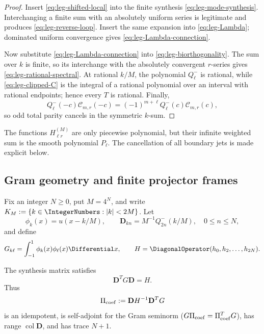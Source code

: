{\begin{proof}
Insert \eqref{eq:leg-shifted-local} into the finite synthesis
\eqref{eq:leg-mode-synthesis}.  Interchanging a finite sum with an absolutely
uniform series is legitimate and produces \eqref{eq:leg-reverse-loop}.
Insert the same expansion into \eqref{eq:leg-Lambda}; dominated uniform
convergence gives \eqref{eq:leg-Lambda-connection}.

Now substitute \eqref{eq:leg-Lambda-connection} into
\eqref{eq:leg-biorthogonality}.  The sum over $k$ is finite, so its
interchange with the absolutely convergent $r$-series gives
\eqref{eq:leg-rational-spectral}.  At rational $k/M$, the polynomial
$Q_\ell^-$ is rational, while \eqref{eq:leg-clipped-C} is the integral of a
rational polynomial over an interval with rational endpoints; hence every
$T$ is rational.  Finally,
\[
 Q_\ell^-(-c)\mathscr C_{m,r}(-c)
 =(-1)^{m+\ell}Q_\ell^-(c)\mathscr C_{m,r}(c),
\]
so odd total parity cancels in the symmetric $k$-sum.
\end{proof}

The functions $H_{\ell r}^{(M)}$ are only piecewise polynomial, but their
infinite weighted sum is the smooth polynomial $P_\ell$.  The cancellation of
all boundary jets is made explicit below.

\subsection{Gram geometry and finite projector frames}

Fix an integer $N\ge0$, put $M=4^N$, and write
$K_M:=\{k\in\IntegerNumbers:|k|<2M\}$.  Let
\[
 \phi_k(x)=u(x-k/M),\qquad
 \mathbf D_{kn}=M^{-1}Q_{2n}^-(k/M),\quad 0\le n\le N,
\]
and define
\[
 G_{k\ell}=\int_{-1}^{1}\phi_k(x)\phi_\ell(x)\Differential x,\qquad
 H=\DiagonalOperator(h_0,h_2,\ldots,h_{2N}).
\]

\begin{theorem}
\label{thm:leg-Gram}
The synthesis matrix satisfies
\begin{equation}
 \boxed{\mathbf D^TG\mathbf D=H.}
 \label{eq:leg-DtGD}
\end{equation}
Thus
\begin{equation}
 \Pi_{\rm coef}:=\mathbf D H^{-1}\mathbf D^TG
 \label{eq:leg-coef-projector}
\end{equation}
is an idempotent, is self-adjoint for the Gram seminorm
($G\Pi_{\rm coef}=\Pi_{\rm coef}^TG$), has range
$\operatorname{col}\mathbf D$, and has trace $N+1$.


\end{theorem}}
